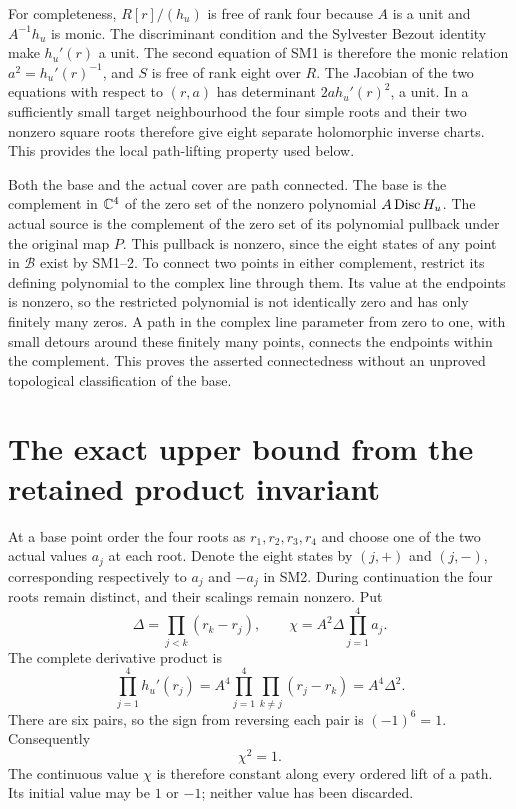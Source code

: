 For completeness, $R[r]/(h_u)$ is free of rank four because $A$
is a unit and $A^{-1}h_u$ is monic. The discriminant condition
and the Sylvester Bezout identity make $h_u'(r)$ a unit. The
second equation of SM1 is therefore the monic relation
$a^2=h_u'(r)^{-1}$, and $S$ is free of rank eight over $R$.
The Jacobian of the two equations with respect to $(r,a)$ has
determinant $2a h_u'(r)^2$, a unit. In a sufficiently small target
neighbourhood the four simple roots and their two nonzero square
roots therefore give eight separate holomorphic inverse charts.
This provides the local path-lifting property used below.

Both the base and the actual cover are path connected. The base
is the complement in $\mathbb C^4$ of the zero set of the nonzero
polynomial $A\operatorname{Disc} H_u$. The actual source is the complement
of the zero set of its polynomial pullback under the original map
$P$. This pullback is nonzero, since the eight states of any point
in $\mathcal B$ exist by SM1--2. To connect two points in either
complement, restrict its defining polynomial to the complex line
through them. Its value at the endpoints is nonzero, so the
restricted polynomial is not identically zero and has only
finitely many zeros. A path in the complex line parameter from
zero to one, with small detours around these finitely many points,
connects the endpoints within the complement. This proves the
asserted connectedness without an unproved topological
classification of the base.

\section{The exact upper bound from the retained product invariant}
At a base point order the four roots as $r_1,r_2,r_3,r_4$ and
choose one of the two actual values $a_j$ at each root. Denote
the eight states by $(j,+)$ and $(j,-)$, corresponding respectively
to $a_j$ and $-a_j$ in SM2. During continuation the four roots
remain distinct, and their scalings remain nonzero. Put
\[
 \Delta=\prod_{j<k}(r_k-r_j),\qquad
 \chi=A^2\Delta\prod_{j=1}^4a_j.
\]
The complete derivative product is
\[
 \prod_{j=1}^4h_u'(r_j)
 =A^4\prod_{j=1}^4\prod_{k\ne j}(r_j-r_k)
 =A^4\Delta^2.
\]
There are six pairs, so the sign from reversing each pair is
$(-1)^6=1$. Consequently
\begin{equation}
 \chi^2=1.\tag{SM3}
\end{equation}
The continuous value $\chi$ is therefore constant along every
ordered lift of a path. Its initial value may be $1$ or $-1$;
neither value has been discarded.

